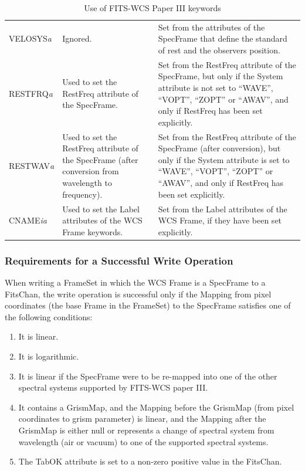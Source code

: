 \documentclass[twoside,11pt]{article}
\newcommand{\fitskey}[3]{{#1}&{#2}&{#3}\\}
\begin{document}
\begin{table}[htbp]
\begin{tabular}{|l|p{2.5in}|p{2.5in}|}
\fitskey{VELOSYS\emph{a}}{Ignored.}{Set from the attributes of the
SpecFrame that define the standard of rest and the observers position.}

\fitskey{RESTFRQ\emph{a}}{Used to set the RestFreq
attribute of the SpecFrame.}{Set from the RestFreq attribute of the
SpecFrame, but only if the System attribute is not set to
``WAVE'', ``VOPT'', ``ZOPT'' or ``AWAV'', and only if RestFreq has been set
explicitly.}

\fitskey{RESTWAV\emph{a}}{Used to set the RestFreq
attribute of the SpecFrame (after conversion from wavelength to frequency).}
{Set from the RestFreq attribute of the SpecFrame (after conversion), but only if the
System attribute is set to ``WAVE'', ``VOPT'', ``ZOPT'' or
``AWAV'', and only if RestFreq has been set explicitly.}

\fitskey{CNAME\emph{ia}}{Used to set the Label attributes of
the WCS Frame keywords.}{Set from the Label attributes of the WCS Frame,
if they have been set explicitly.}
\hline
\end{tabular}
\vspace{3.mm}
\caption{Use of FITS-WCS Paper III keywords}
\label{tab:fitspaper3}
\end{table}

\subsubsection{Requirements for a Successful Write Operation}
When writing a FrameSet in which the WCS Frame is a SpecFrame to a
FitsChan, the write operation is successful only if
the Mapping from pixel coordinates (the base Frame
in the FrameSet) to the SpecFrame satisfies one of the following conditions:

\begin{enumerate}
\item It is linear.
\item It is logarithmic.
\item It is linear if the SpecFrame were to be re-mapped into one of the
other spectral systems supported by FITS-WCS paper III.
\item It contains a GrismMap, and the Mapping before the GrismMap (from
pixel coordinates to grism parameter) is linear, and the Mapping after the
GrismMap is either null or represents a change of spectral system from wavelength (air or
vacuum) to one of the supported spectral systems.
\item The TabOK attribute is set to a non-zero positive value in the FitsChan.
\end{enumerate}
\end{document}
